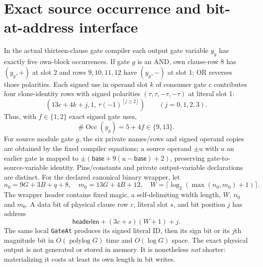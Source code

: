 \documentclass[11pt]{article}
\begin{document}
\section{Exact source occurrence and bit-at-address interface}
In the actual thirteen-clause gate compiler each output gate variable $y_g$ has exactly five own-block occurrences. If gate $g$ is an AND, own clause-row $8$ has $(y_g,+)$ at slot 2 and rows $9,10,11,12$ have $(y_g,-)$ at slot 1; OR reverses those polarities. Each signed use in operand slot $k$ of consumer gate $c$ contributes four clone-identity rows with signed polarities $(\tau,\tau,-\tau,-\tau)$ at literal slot 1:
\[
  (13c+4k+j,1,\,\tau(-1)^{[j\ge2]})\qquad (j=0,1,2,3).
\]
Thus, with $f\in\{1,2\}$ exact signed gate uses,
\[
             \#\operatorname{Occ}(y_g)=5+4f\in\{9,13\}.
\]
For source module gate $g$, the six private names/rows and signed operand copies are obtained by the fixed compiler equations; a source operand $\pm u$ with $u$ an earlier gate is mapped to $\pm(\mathsf{base}+9(u-\mathsf{base})+2)$, preserving gate-to-source-variable identity. Pins/constants and private output-variable declarations are distinct. For the declared canonical binary wrapper, let
\[
 n_0=9G+3B+q+8,\quad m_0=13G+4B+12,\quad W=\lceil\log_2(\max(n_0,m_0)+1)\rceil.
\]
The wrapper header contains fixed magic, a self-delimiting width length, $W$, $n_0$ and $m_0$. A data bit of physical clause row $c$, literal slot $s$, and bit position $j$ has address
\[
     \mathsf{headerlen}+(3c+s)(W+1)+j.                 \tag{*}
\]
The same local \texttt{GateAt} produces its signed literal ID, then its sign bit or its $j$th magnitude bit in $O(\operatorname{polylog}G)$ time and $O(\log G)$ space. The exact physical output is not generated or stored in memory. It is nonetheless \emph{not} shorter: materializing it costs at least its own length in bit writes.
\end{document}
